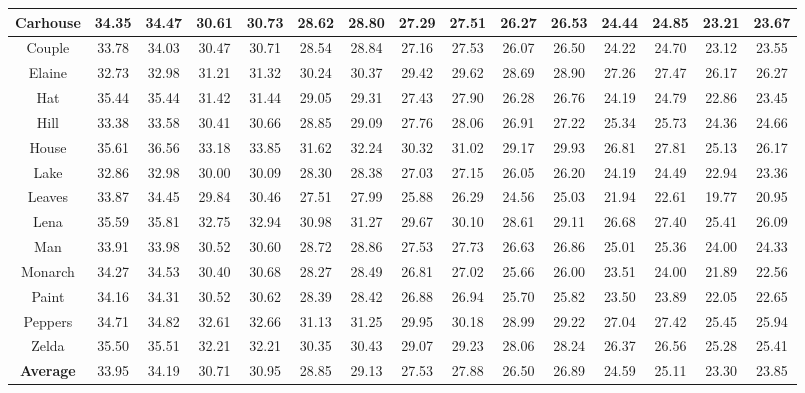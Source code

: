 \begin{table}
\begin{adjustwidth}{-3cm}{}
\begin{tabular}{|c||c|c||c|c||c|c||c|c||c|c||c|c||c|c|}
Carhouse&34.35 &34.47     &30.61&30.73   &28.62 & 28.80  & 27.29&27.51  &26.27 &26.53  &24.44&24.85    &23.21&23.67
\\
\hline
Couple &33.78&34.03       &30.47&30.71  & 28.54 & 28.84 & 27.16 & 27.53   &26.07 & 26.50  &24.22 &24.70   &23.12 &23.55
\\
\hline
Elaine&32.73&32.98   &31.21&31.32    &30.24& 30.37   &29.42&29.62   &28.69 &28.90   &27.26&27.47   &26.17&26.27
\\
\hline
Hat&35.44&35.44      &31.42 &31.44  & 29.05&29.31   &27.43&27.90  & 26.28 &26.76  &24.19 & 24.79    &22.86&23.45
\\
\hline
Hill&33.38&33.58     &30.41&30.66   &28.85 & 29.09   &27.76 & 28.06  & 26.91 &27.22  &25.34 & 25.73   &24.36 &24.66
\\
\hline
House&35.61&36.56      &33.18&33.85   & 31.62& 32.24  &30.32 &31.02  & 29.17 &29.93   &26.81 & 27.81  & 25.13&26.17  
\\
\hline
Lake&32.86&32.98     &30.00&30.09   &28.30 &28.38   &27.03 & 27.15  & 26.05 &26.20   &24.19 &24.49    &22.94 &23.36
\\
\hline
Leaves&33.87& 34.45     &29.84&30.46    &27.51 &27.99  & 25.88 & 26.29  &24.56 &25.03   &21.94& 22.61   &19.77&20.95
\\
\hline  
Lena&35.59&35.81     &32.75&32.94  &30.98 &31.27  &29.67 &30.10   &28.61 & 29.11   &26.68 &  27.40      &25.41 &26.09
\\
\hline
Man&33.91&33.98      &30.52&30.60  & 28.72 & 28.86   &27.53 & 27.73   &26.63 &  26.86  &25.01& 25.36     &24.00 &24.33 
\\
\hline
Monarch&34.27&34.53    &30.40&30.68   & 28.27&28.49    &26.81 &27.02  &25.66 & 26.00  &23.51 & 24.00       &21.89 &22.56 
\\
\hline
Paint &34.16&34.31    &30.52&30.62   &28.39 &28.42   & 26.88 & 26.94  &25.70 & 25.82 &23.50& 23.89  &22.05&22.65
\\
\hline
Peppers&34.71&34.82    & 32.61&32.66   &31.13 & 31.25 &29.95  & 30.18  &28.99 & 29.22  &27.04&  27.42    &25.45 &25.94
\\  
\hline
Zelda&35.50&35.51    &32.21&32.21  & 30.35 &30.43   &29.07 &29.23   & 28.06& 28.24  &26.37& 26.56     &25.28&25.41
\\
\hline
\textbf{Average}&33.95&34.19    &30.71&30.95   & 28.85 & 29.13   &27.53&27.88   & 26.50 & 26.89  &24.59 &25.11  &23.30&23.85       
\\
\hline
\end{tabular}
\end{adjustwidth}
\end{table}

